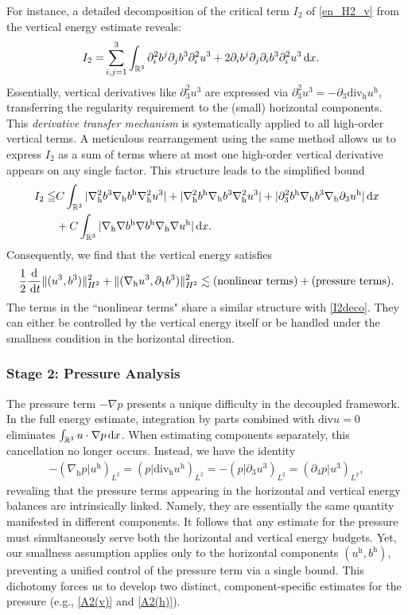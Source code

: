 \documentclass[11pt]{amsart}
\theoremstyle{definition}
\newcommand{\R}{\mathbb{R}}
\newcommand{\h}{\mathrm{h}}
\newcommand{\dx}{\,{\rm d}x}
\newcommand{\dt}{\,{\rm d}t}
\newcommand{\nablah}{\nabla_{\mathrm{h}}}
\numberwithin{equation}{section}
\begin{document}
For instance, a detailed decomposition of the critical term $I_2$ of \eqref{en_H2_v} from the vertical energy estimate reveals:
\begin{align*}
	I_2=&\sum_{i,j=1}^3\int_{\R^3}\partial_i^2b^j\partial_jb^3\partial_i^2u^3+2\partial_ib^j\partial_j\partial_ib^3\partial_i^2u^3	\dx.
\end{align*}
Essentially,   vertical derivatives like $\partial_3^2 u^3$ are expressed via $\partial_3^2 u^3 = -\partial_3\mathrm{div}_\mathrm{h} u^\mathrm{h}$, transferring the regularity requirement to the (small) horizontal components. This \emph{derivative transfer mechanism} is systematically applied to all high-order vertical terms. A meticulous rearrangement using the same method allows us to express $I_2$ as a sum of terms where at most one high-order vertical derivative appears on any single factor. This structure leads to the simplified bound
\begin{align}\label{I2deco}
	I_2\leqq &C\int_{\R^3}|\nablah^2b^3\nablah b^\h \nablah^2 u^3|+|\nablah^2b^\h\nablah b^3 \nablah^2 u^3|+|\partial_3^2b^\h\nablah b^3 \nablah\partial_3 u^\h|\dx\nonumber\\
	&+C\int_{\R^3}|\nablah\nabla b^\h\nabla b^\h \nablah \nabla u^\h|\dx.
\end{align}
Consequently, we find that the vertical energy satisfies
\begin{align*}
	\frac12\frac{\mathrm{d}}{\dt}\|(u^3,b^3)\|_{H^2}^2 + \|(\nabla_\mathrm{h} u^3,\partial_1b^3)\|_{H^2}^2 \lesssim \text{(nonlinear terms)} + \text{(pressure terms)}.
\end{align*}
The terms in the ``nonlinear terms" share a similar structure with \eqref{I2deco}. They can either be controlled by the vertical energy itself or be handled under the smallness condition in the horizontal direction.
\subsubsection{Stage 2: Pressure Analysis}

The pressure term $-\nabla p$ presents a unique difficulty in the decoupled framework. In the full energy estimate, integration by parts combined with $\mathrm{div} u = 0$ eliminates $\int_{\R^3} u\cdot\nabla p \dx$. When estimating components separately, this cancellation no longer occurs. Instead, we have the identity
\begin{align}\label{p_same}
	-(\nabla_\mathrm{h} p  |u^\mathrm{h})_{L^2} = (p  |\mathrm{div}_\mathrm{h} u^\mathrm{h})_{L^2} = -(p  |\partial_3 u^3)_{L^2} = (\partial_3 p | u^3)_{L^2},
\end{align}
revealing that the pressure terms appearing in the horizontal and vertical energy balances are intrinsically linked. Namely, they are essentially the same quantity manifested in different components. It follows that any estimate for the pressure must simultaneously serve both the horizontal and vertical energy budgets. Yet, our smallness assumption applies only to the horizontal components $(u^\h, b^\h)$, preventing a unified control of the pressure term via a single bound. This dichotomy forces us to develop two distinct, component-specific estimates for the pressure (e.g., \eqref{A2(v)} and \eqref{A2(h)}).
\end{document}
